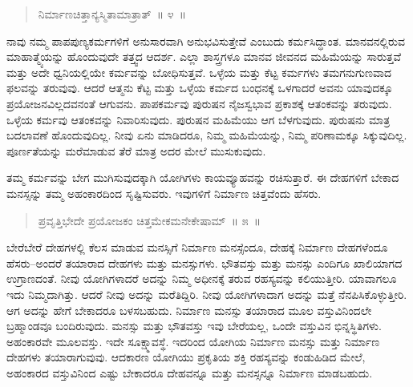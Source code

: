\begin{verse}
ನಿರ್ಮಾಣಚಿತ್ತಾನ್ಯಸ್ಮಿತಾಮಾತ್ರಾತ್​~॥ ೪~॥
\end{verse}

\vspace{-0.3cm}


\vspace{0.2cm}


ನಾವು ನಮ್ಮ ಪಾಪಪುಣ್ಯಕರ್ಮಗಳಿಗೆ ಅನುಸಾರವಾಗಿ ಅನುಭವಿಸುತ್ತೇವೆ ಎಂಬುದು ಕರ್ಮಸಿದ್ಧಾಂತ. ಮಾನವನಲ್ಲಿರುವ ಮಾಹಾತ್ಮ್ಯೆಯನ್ನು ಹೊಂದುವುದೇ ತತ್ತ್ವದ ಆದರ್ಶ. ಎಲ್ಲಾ ಶಾಸ್ತ್ರಗಳೂ ಮಾನವ ಜೀವನದ ಮಹಿಮೆಯನ್ನು ಸಾರುತ್ತವೆ ಮತ್ತು ಅದೇ ಧ್ವನಿಯಲ್ಲಿಯೇ ಕರ್ಮವನ್ನು ಬೋಧಿಸುತ್ತವೆ. ಒಳ್ಳೆಯ ಮತ್ತು ಕೆಟ್ಟ ಕರ್ಮಗಳು ತಮಗನುಗುಣವಾದ ಫಲವನ್ನು ತರುವುವು. ಆದರೆ ಆತ್ಮನು ಕೆಟ್ಟ ಮತ್ತು ಒಳ್ಳೆಯ ಕರ್ಮದ ಬಂಧನಕ್ಕೆ ಒಳಗಾದರೆ ಅವನು ಯಾವುದಕ್ಕೂ ಪ್ರಯೋಜನವಿಲ್ಲದವನಂತೆ ಆಗುವನು. ಪಾಪಕರ್ಮವು ಪುರುಷನ ನೈಜಸ್ವಭಾವ ಪ್ರಕಾಶಕ್ಕೆ ಆತಂಕವನ್ನು ತರುವುದು. ಒಳ್ಳೆಯ ಕರ್ಮವು ಆತಂಕವನ್ನು ನಿವಾರಿಸುವುದು. ಪುರುಷನ ಮಹಿಮೆಯು ಆಗ ಬೆಳಗುವುದು. ಪುರುಷನು ಮಾತ್ರ ಬದಲಾವಣೆ ಹೊಂದುವುದಿಲ್ಲ. ನೀವು ಏನು ಮಾಡಿದರೂ, ನಿಮ್ಮ ಮಹಿಮೆಯನ್ನು, ನಿಮ್ಮ ಪರಿಣಾಮಕ್ಕೂ ಸಿಕ್ಕುವುದಿಲ್ಲ. ಪೂರ್ಣತೆಯನ್ನು ಮರೆಮಾಡುವ ತೆರೆ ಮಾತ್ರ ಅದರ ಮೇಲೆ ಮುಸುಕುವುದು. 

ತಮ್ಮ ಕರ್ಮವನ್ನು ಬೇಗ ಮುಗಿಸುವುದಕ್ಕಾಗಿ ಯೋಗಿಗಳು ಕಾಯವ್ಯೂಹವನ್ನು ರಚಿಸುತ್ತಾರೆ. ಈ ದೇಹಗಳಿಗೆ ಬೇಕಾದ ಮನಸ್ಸನ್ನು ತಮ್ಮ ಅಹಂಕಾರದಿಂದ ಸೃಷ್ಟಿಸುವರು. ಇವುಗಳಿಗೆ ನಿರ್ಮಾಣ ಚಿತ್ತವೆಂದು ಹೆಸರು. 

\vspace{-0.2cm}

\begin{verse}
ಪ್ರವೃತ್ತಿಭೇದೇ ಪ್ರಯೋಜಕಂ ಚಿತ್ತಮೇಕಮನೇಕೇಷಾಮ್​~॥ ೫~॥
\end{verse}

\vspace{-0.4cm}


\vspace{0.2cm}

ಬೇರೆಬೇರೆ ದೇಹಗಳಲ್ಲಿ ಕೆಲಸ ಮಾಡುವ ಮನಸ್ಸಿಗೆ ನಿರ್ಮಾಣ ಮನಸ್ಸೆಂದೂ, ದೇಹಕ್ಕೆ ನಿರ್ಮಾಣ ದೇಹಗಳೆಂದೂ ಹೆಸರು–ಅಂದರೆ ತಯಾರಾದ ದೇಹಗಳು ಮತ್ತು ಮನಸ್ಸುಗಳು. ಭೌತವಸ್ತು ಮತ್ತು ಮನಸ್ಸು ಎಂದಿಗೂ ಖಾಲಿಯಾಗದ ಉಗ್ರಾಣದಂತೆ. ನೀವು ಯೋಗಿಗಳಾದರೆ ಅದನ್ನು ನಿಮ್ಮ ಅಧೀನಕ್ಕೆ ತರುವ ರಹಸ್ಯವನ್ನು ಕಲಿಯುತ್ತೀರಿ. ಯಾವಾಗಲೂ ಇದು ನಿಮ್ಮದಾಗಿತ್ತು. ಆದರೆ ನೀವು ಅದನ್ನು ಮರೆತಿದ್ದಿರಿ. ನೀವು ಯೋಗಿಗಳಾದಾಗ ಅದನ್ನು ಮತ್ತೆ ನೆನಪಿಸಿಕೊಳ್ಳುತ್ತೀರಿ. ಆಗ ಅದನ್ನು ಹೇಗೆ ಬೇಕಾದರೂ ಬಳಸಬಹುದು. ನಿರ್ಮಾಣ ಮನಸ್ಸು ತಯಾರಾದ ಮೂಲ ವಸ್ತುವಿನಿಂದಲೇ ಬ್ರಹ್ಮಾಂಡವೂ  ಬಂದಿರುವುದು. ಮನಸ್ಸು ಮತ್ತು ಭೌತವಸ್ತು ಇವು ಬೇರೆಯಲ್ಲ, ಒಂದೇ ವಸ್ತುವಿನ ಭಿನ್ನಸ್ಥಿತಿಗಳು. ಅಹಂಕಾರವೇ ಮೂಲವಸ್ತು. ಇದೇ ಸೂಕ್ಷ್ಮಾವಸ್ಥೆ. ಇದರಿಂದ ಯೋಗಿಯ ನಿರ್ಮಾಣ ಮನಸ್ಸು ಮತ್ತು ನಿರ್ಮಾಣ ದೇಹಗಳು ತಯಾರಾಗುವುವು. ಆದಕಾರಣ ಯೋಗಿಯು ಪ್ರಕೃತಿಯ ಶಕ್ತಿ ರಹಸ್ಯವನ್ನು ಕಂಡುಹಿಡಿದ ಮೇಲೆ, ಅಹಂಕಾರದ ವಸ್ತುವಿನಿಂದ ಎಷ್ಟು ಬೇಕಾದರೂ ದೇಹವನ್ನೂ ಮತ್ತು ಮನಸ್ಸನ್ನೂ ನಿರ್ಮಾಣ ಮಾಡಬಹುದು. 

